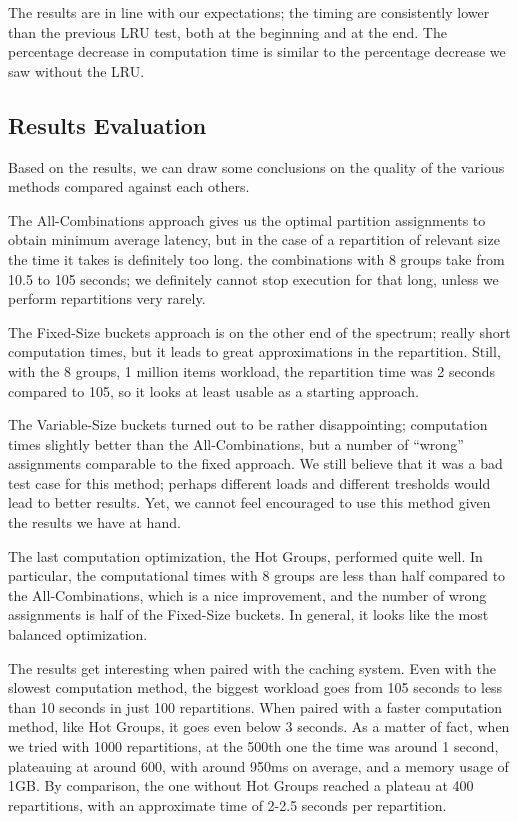 The results are in line with our expectations; the timing are consistently lower than the previous LRU test, both at the beginning and at the end. The percentage decrease in computation time is similar to the percentage decrease we saw without the LRU.

\subsection{Results Evaluation}\label{sec:results-evaluation}
Based on the results, we can draw some conclusions on the quality of the various methods compared against each others. 

The All-Combinations approach gives us the optimal partition assignments to obtain minimum average latency, but in the case of a repartition of relevant size the time it takes is definitely too long. the combinations with 8 groups take from 10.5 to 105 seconds; we definitely cannot stop execution for that long, unless we perform repartitions very rarely.

The Fixed-Size buckets approach is on the other end of the spectrum; really short computation times, but it leads to great approximations in the repartition. Still, with the 8 groups, 1 million items workload, the repartition time was 2 seconds compared to 105, so it looks at least usable as a starting approach.

The Variable-Size buckets turned out to be rather disappointing; computation times slightly better than the All-Combinations, but a number of ``wrong'' assignments comparable to the fixed approach. We still believe that it was a bad test case for this method; perhaps different loads and different tresholds would lead to better results. Yet, we cannot feel encouraged to use this method given the results we have at hand.

The last computation optimization, the Hot Groups, performed quite well. In particular, the computational times with 8 groups are less than half compared to the All-Combinations, which is a nice improvement, and the number of wrong assignments is half of the Fixed-Size buckets. In general, it looks like the most balanced optimization.

The results get interesting when paired with the caching system. Even with the slowest computation method, the biggest workload goes from 105 seconds to less than 10 seconds in just 100 repartitions. When paired with a faster computation method, like Hot Groups, it goes even below 3 seconds. As a matter of fact, when we tried with 1000 repartitions, at the 500th one the time was around 1 second, plateauing at around 600, with around 950ms on average, and a memory usage of 1GB.
By comparison, the one without Hot Groups reached a plateau at 400 repartitions, with an approximate time of 2-2.5 seconds per repartition.

